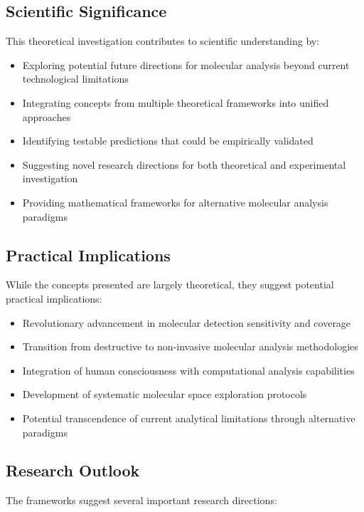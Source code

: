 \documentclass[11pt,a4paper]{article}
\theoremstyle{remark}
\begin{document}
{{{{{{{{{{\subsection{Scientific Significance}

This theoretical investigation contributes to scientific understanding by:

\begin{itemize}
\item Exploring potential future directions for molecular analysis beyond current technological limitations
\item Integrating concepts from multiple theoretical frameworks into unified approaches
\item Identifying testable predictions that could be empirically validated
\item Suggesting novel research directions for both theoretical and experimental investigation
\item Providing mathematical frameworks for alternative molecular analysis paradigms
\end{itemize}

\subsection{Practical Implications}

While the concepts presented are largely theoretical, they suggest potential practical implications:

\begin{itemize}
\item Revolutionary advancement in molecular detection sensitivity and coverage
\item Transition from destructive to non-invasive molecular analysis methodologies
\item Integration of human consciousness with computational analysis capabilities
\item Development of systematic molecular space exploration protocols
\item Potential transcendence of current analytical limitations through alternative paradigms
\end{itemize}

\subsection{Research Outlook}

The frameworks suggest several important research directions:

}}}}}}}}}}
\end{document}
